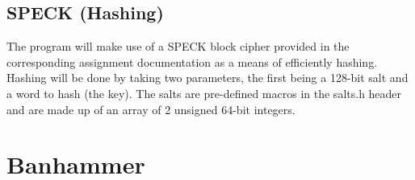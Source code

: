 \documentclass[
	12pt, %
]{fphw}
\begin{document}
\subsection{SPECK (Hashing)}

The program will make use of a SPECK block cipher provided in the corresponding assignment documentation as a means of efficiently hashing. Hashing will be done by taking two parameters, the first being a 128-bit salt and a word to hash (the key). The salts are pre-defined macros in the salts.h header and are made up of an array of 2 unsigned 64-bit integers.

\section{Banhammer}
\end{document}
